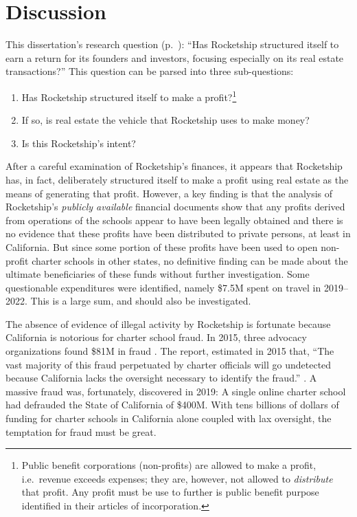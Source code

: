 
\chapter{Discussion}\label{ch:discussion}\indent%

This dissertation's research question (p.~\pageref{sec:research-question}): ``Has Rocketship structured itself to earn a return for its founders and investors, focusing especially on its real estate transactions?'' This question can be parsed into three sub-questions:
\begin{enumerate}
  \item Has Rocketship structured itself to make a profit?\footnote{Public benefit corporations (non-profits) are allowed to make a profit, i.e.\ revenue exceeds expenses; they are, however, not allowed to \textit{distribute} that profit. Any profit must be use to further is public benefit purpose identified in their articles of incorporation.}
  \item If so, is real estate the vehicle that Rocketship uses to make money?
  \item Is this Rocketship's intent?
\end{enumerate}

%
After a careful examination of Rocketship's finances, it appears that Rocketship has, in fact, deliberately structured itself to make a profit using real estate as the means of generating that profit. However, a key finding is that the analysis of Rocketship's \textit{publicly available} financial documents show that any profits derived from operations of the schools appear to have been legally obtained and there is no evidence that these profits have been distributed to private persons, at least in California. But since some portion of these profits have been used to open non-profit charter schools in other states, no definitive finding can be made about the ultimate beneficiaries of these funds without further investigation. Some questionable expenditures were identified, namely \$7.5M spent on travel in 2019–2022. This is a large sum, and should also be investigated.%

The absence of evidence of illegal activity by Rocketship is fortunate because California is notorious for charter school fraud. In 2015, three advocacy organizations found \$81M in fraud \citeauthor{CPD2015.etal}. The report,  estimated in 2015 that, ``The vast majority of this fraud perpetuated by charter officials will go undetected because California lacks the oversight necessary to identify the fraud.'' \parencite[2]{CPD2015.etal}. A massive fraud was, fortunately, discovered in 2019: A single online charter school had defrauded the State of California of \$400M. With tens billions of dollars of funding for charter schools in California alone coupled with lax oversight, the temptation for fraud must be great. 

